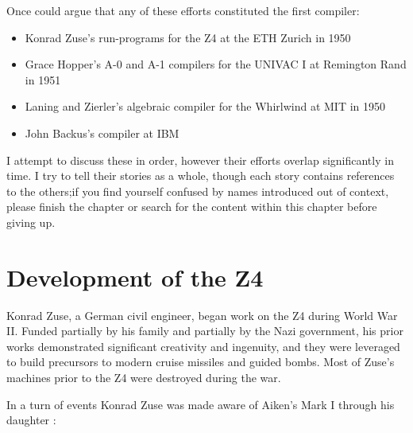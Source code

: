 \bigskip
Once could argue that any of these efforts constituted the first compiler:
\begin{itemize}
	\item Konrad Zuse's run-programs for the Z4 at the ETH Zurich in 1950
	\item Grace Hopper's A-0 and A-1 compilers for the UNIVAC I at
	      Remington Rand in 1951
	\item Laning and Zierler's algebraic compiler for the Whirlwind at MIT in 1950
	\item John Backus's \FTNI{} compiler at IBM
\end{itemize}

I attempt to discuss these in order, however their efforts overlap
significantly in time. I try to tell their stories as a whole, though each story
contains references to the others;if you find yourself confused by names
introduced out of context, please finish the chapter or search for the content
within this chapter before giving up.

\section{Development of the Z4}

Konrad Zuse, a German civil engineer, began work on the Z4 during World War
II. Funded partially by his family and partially by the Nazi government, his
prior works demonstrated significant creativity and ingenuity, and they were
leveraged to build precursors to modern cruise missiles and guided bombs. Most of
Zuse's machines prior to the Z4 were destroyed during the war. 

In a turn of events Konrad Zuse was made
aware of Aiken's Mark I through his daughter
\cite{howard_aiken_and_the_dawn_of_the_computer_age_2000}:

